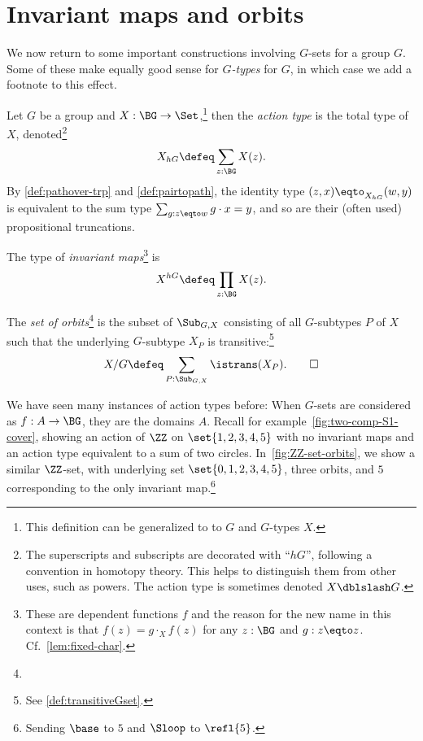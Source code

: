 \section{Invariant maps and orbits}
\label{sec:fixpts-orbits}
We now return to some important constructions involving $G$-sets for a group $G$.
Some of these make equally good sense for \emph{$G$-types} for \aninftygp
$G$, in which case we add a footnote to this effect.
\begin{definition}
  \label{def:actiontype} Let $G$ be a group and $X : \BG\to\Set$,\footnote{%
  This definition can be generalized to to \inftygps $G$ and $G$-types $X$.}
  then the \emph{action type}
  is the total type of $X$, denoted\footnote{%
    The superscripts and subscripts are decorated with ``$hG$'',
    following a convention in homotopy theory.
    This helps to distinguish them from other uses, such as powers.
    The action type is sometimes denoted $X \dblslash G$.}
\[
  X_{hG} \defeq \sum_{z:\BG} X(z).
\]
By \cref{def:pathover-trp} and \cref{def:pairtopath}, 
the identity type $(z,x)\eqto_{X_{hG}}(w,y)$
is equivalent to the sum type $\sum_{g:z\eqto w} g\cdot x = y$,
and so are their (often used) propositional truncations.

The type of \emph{invariant maps}\footnote{%
These are dependent functions $f$ and the reason for the new name
in this context is that $f(z) = g \cdot_X f(z)$ for any $z:\BG$
and $g:z\eqto z$. Cf.~\cref{lem:fixed-char}.}
 is
\[
  X^{hG} \defeq \prod_{z:\BG} X(z).
\]

The \emph{set of orbits}\footnote{}
 is the subset of $\Sub_{G,X}$ consisting
of all $G$-subtypes $P$ of $X$ such that the underlying $G$-subtype $X_P$
is transitive:\footnote{See \cref{def:transitiveGset}.}
\[
  X / G \defeq \sum_{P:\Sub_{G,X}}\istrans(X_P).\qedhere
\]
\end{definition}

We have seen many instances of action types before:
When $G$-sets are considered as \coverings $f : A \to \BG$,
they are the domains $A$.
Recall for example~\cref{fig:two-comp-S1-cover},
showing an action of $\ZZ$ on $\set{1,2,3,4,5}$ with no invariant maps
and an action type equivalent to a sum of two circles.
In~\cref{fig:ZZ-set-orbits}, we show a similar $\ZZ$-set,
with underlying set $\set{0,1,2,3,4,5}$, three orbits,
and $5$ corresponding to the only invariant map.\footnote{%
Sending $\base$ to $5$ and $\Sloop$ to $\refl{5}$.}

